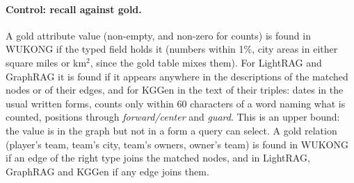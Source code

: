 \documentclass[11pt]{article}
\newcommand{\wk}{WUKONG}
\begin{document}
\paragraph{Control: recall against gold.} A gold attribute value (non-empty, and non-zero for
counts) is found in \wk{} if the typed field holds it (numbers within 1\%, city areas in either
square miles or km$^2$, since the gold table mixes them). For LightRAG and GraphRAG it is found if
it appears anywhere in the descriptions of the matched nodes or of their edges, and for KGGen in
the text of their triples: dates in the usual
written forms, counts only within 60 characters of a word naming what is counted, positions through
\emph{forward/center} and \emph{guard}. This is an upper bound: the value is in the graph but not
in a form a query can select. A gold relation (player's team, team's city, team's owners, owner's
team) is found in \wk{} if an edge of the right type joins the matched nodes, and in LightRAG,
GraphRAG and KGGen if any edge joins them.
\end{document}
